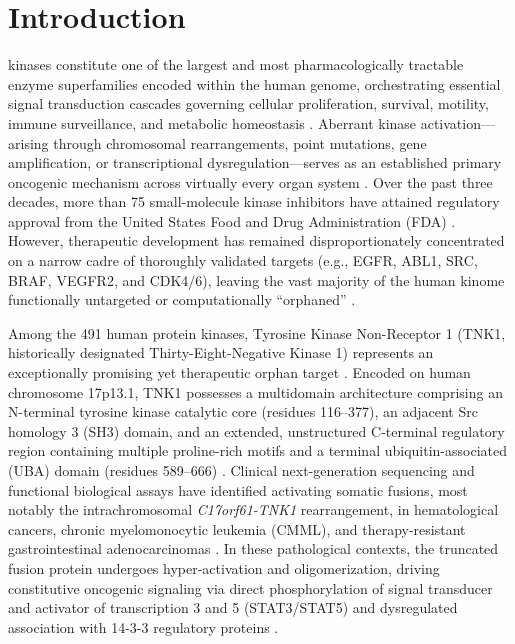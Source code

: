 \documentclass[journal]{IEEEtran}
\begin{document}
\section{Introduction}
 kinases constitute one of the largest and most pharmacologically tractable enzyme superfamilies encoded within the human genome, orchestrating essential signal transduction cascades governing cellular proliferation, survival, motility, immune surveillance, and metabolic homeostasis \cite{manning2002kinome, bhullar2018kinase}. Aberrant kinase activation—arising through chromosomal rearrangements, point mutations, gene amplification, or transcriptional dysregulation—serves as an established primary oncogenic mechanism across virtually every organ system \cite{roskoski2023properties}. Over the past three decades, more than 75 small-molecule kinase inhibitors have attained regulatory approval from the United States Food and Drug Administration (FDA) \cite{cohen2021kinase}. However, therapeutic development has remained disproportionately concentrated on a narrow cadre of thoroughly validated targets (e.g., EGFR, ABL1, SRC, BRAF, VEGFR2, and CDK4/6), leaving the vast majority of the human kinome functionally untargeted or computationally ``orphaned'' \cite{fedele2020untargeted}.

Among the 491 human protein kinases, Tyrosine Kinase Non-Receptor 1 (TNK1, historically designated Thirty-Eight-Negative Kinase 1) represents an exceptionally promising yet therapeutic orphan target \cite{hoare2008tnk1, gu2010tnk1}. Encoded on human chromosome 17p13.1, TNK1 possesses a multidomain architecture comprising an N-terminal tyrosine kinase catalytic core (residues 116--377), an adjacent Src homology 3 (SH3) domain, and an extended, unstructured C-terminal regulatory region containing multiple proline-rich motifs and a terminal ubiquitin-associated (UBA) domain (residues 589--666) \cite{chan2021tnk1, bateman2022tnk1}. Clinical next-generation sequencing and functional biological assays have identified activating somatic fusions, most notably the intrachromosomal \textit{C17orf61-TNK1} rearrangement, in hematological cancers, chronic myelomonocytic leukemia (CMML), and therapy-resistant gastrointestinal adenocarcinomas \cite{chan2021tnk1}. In these pathological contexts, the truncated fusion protein undergoes hyper-activation and oligomerization, driving constitutive oncogenic signaling via direct phosphorylation of signal transducer and activator of transcription 3 and 5 (STAT3/STAT5) and dysregulated association with 14-3-3 regulatory proteins \cite{chan2021tnk1}.
\end{document}
